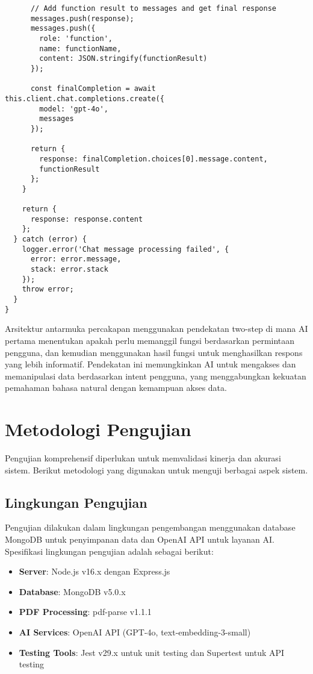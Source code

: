 \begin{verbatim}
      // Add function result to messages and get final response
      messages.push(response);
      messages.push({
        role: 'function',
        name: functionName,
        content: JSON.stringify(functionResult)
      });

      const finalCompletion = await this.client.chat.completions.create({
        model: 'gpt-4o',
        messages
      });

      return {
        response: finalCompletion.choices[0].message.content,
        functionResult
      };
    }

    return {
      response: response.content
    };
  } catch (error) {
    logger.error('Chat message processing failed', {
      error: error.message,
      stack: error.stack
    });
    throw error;
  }
}
\end{verbatim}

Arsitektur antarmuka percakapan menggunakan pendekatan two-step di mana AI pertama menentukan apakah perlu memanggil fungsi berdasarkan permintaan pengguna, dan kemudian menggunakan hasil fungsi untuk menghasilkan respons yang lebih informatif. Pendekatan ini memungkinkan AI untuk mengakses dan memanipulasi data berdasarkan intent pengguna, yang menggabungkan kekuatan pemahaman bahasa natural dengan kemampuan akses data.

\section{Metodologi Pengujian}
Pengujian komprehensif diperlukan untuk memvalidasi kinerja dan akurasi sistem. Berikut metodologi yang digunakan untuk menguji berbagai aspek sistem.

\subsection{Lingkungan Pengujian}
Pengujian dilakukan dalam lingkungan pengembangan menggunakan database MongoDB untuk penyimpanan data dan OpenAI API untuk layanan AI. Spesifikasi lingkungan pengujian adalah sebagai berikut:

\begin{itemize}
    \item \textbf{Server}: Node.js v16.x dengan Express.js
    \item \textbf{Database}: MongoDB v5.0.x
    \item \textbf{PDF Processing}: pdf-parse v1.1.1
    \item \textbf{AI Services}: OpenAI API (GPT-4o, text-embedding-3-small)
    \item \textbf{Testing Tools}: Jest v29.x untuk unit testing dan Supertest untuk API testing
\end{itemize}

